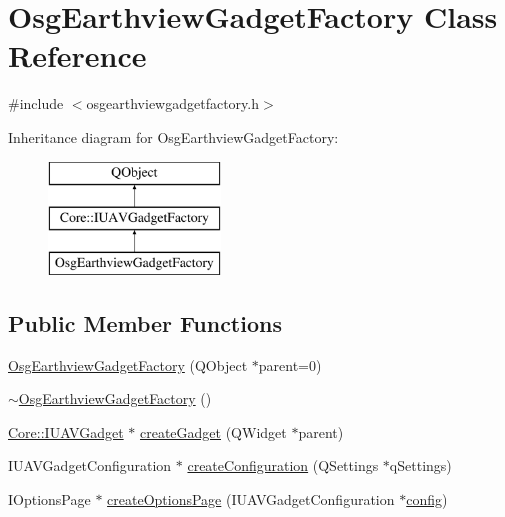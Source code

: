 \hypertarget{class_osg_earthview_gadget_factory}{\section{Osg\-Earthview\-Gadget\-Factory Class Reference}
\label{class_osg_earthview_gadget_factory}
}


{\ttfamily \#include $<$osgearthviewgadgetfactory.\-h$>$}

Inheritance diagram for Osg\-Earthview\-Gadget\-Factory\-:\begin{figure}[H]
\begin{center}
\leavevmode
\includegraphics[height=3.000000cm]{class_osg_earthview_gadget_factory}
\end{center}
\end{figure}
\subsection*{Public Member Functions}
\begin{DoxyCompactItemize}
\item 
\hyperlink{group___osg_earthview_ga80b08d5dc72dc33d68fb003039d09e79}{Osg\-Earthview\-Gadget\-Factory} (Q\-Object $\ast$parent=0)
\item 
\hyperlink{group___osg_earthview_ga3287ca5ea93e70d691a0f8f3ed84e4c9}{$\sim$\-Osg\-Earthview\-Gadget\-Factory} ()
\item 
\hyperlink{class_core_1_1_i_u_a_v_gadget}{Core\-::\-I\-U\-A\-V\-Gadget} $\ast$ \hyperlink{group___osg_earthview_gaf6044184a496af6c6c7c50c271a6ceef}{create\-Gadget} (Q\-Widget $\ast$parent)
\item 
I\-U\-A\-V\-Gadget\-Configuration $\ast$ \hyperlink{group___osg_earthview_ga863730abedc7eb805c2f5f9201aadfdc}{create\-Configuration} (Q\-Settings $\ast$q\-Settings)
\item 
I\-Options\-Page $\ast$ \hyperlink{group___osg_earthview_ga809eda563b3d5d297fc14507d28a122d}{create\-Options\-Page} (I\-U\-A\-V\-Gadget\-Configuration $\ast$\hyperlink{deflate_8c_a4473b5227787415097004fd39f55185e}{config})
\end{DoxyCompactItemize}
